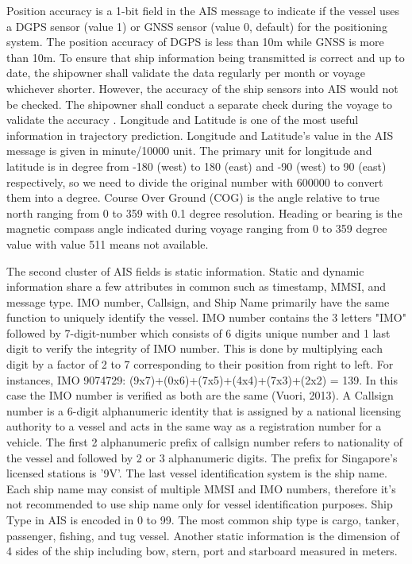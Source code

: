 Position accuracy is a 1-bit field in the AIS message to indicate if the vessel uses a DGPS sensor (value 1) or GNSS sensor (value 0, default) for the positioning system. The position accuracy of DGPS is less than 10m while GNSS is more than 10m. To ensure that ship information being transmitted is correct and up to date, the shipowner shall validate the data regularly per month or voyage whichever shorter. However, the accuracy of the ship sensors into AIS would not be checked. The shipowner shall conduct a separate check during the voyage to validate the accuracy \cite{imo1998}. Longitude and Latitude is one of the most useful information in trajectory prediction. Longitude and Latitude's value in the AIS message is given in minute/10000 unit. The primary unit for longitude and latitude is in degree from -180 (west) to 180 (east) and -90 (west) to 90 (east) respectively, so we need to divide the original number with 600000 to convert them into a degree. Course Over Ground (COG) is the angle relative to true north ranging from 0 to 359 with 0.1 degree resolution. Heading or bearing is the magnetic compass angle indicated during voyage ranging from 0 to 359 degree value with value 511 means not available.

The second cluster of AIS fields is static information. Static and dynamic information share a few attributes in common such as timestamp, MMSI, and message type. IMO number, Callsign, and Ship Name primarily have the same function to uniquely identify the vessel. IMO number contains the 3 letters "IMO" followed by 7-digit-number which consists of 6 digits unique number and 1 last digit to verify the integrity of IMO number. This is done by multiplying each digit by a factor of 2 to 7 corresponding to their position from right to left. For instances, IMO 9074729: (9x7)+(0x6)+(7x5)+(4x4)+(7x3)+(2x2) = 139. In this case the IMO number is verified as both are the same (Vuori, 2013). A Callsign number is a 6-digit alphanumeric identity that is assigned by a national licensing authority to a vessel and acts in the same way as a registration number for a vehicle. The first 2 alphanumeric prefix of callsign number refers to nationality of the vessel and followed by 2 or 3 alphanumeric digits. The prefix for Singapore's licensed stations is '9V'. The last vessel identification system is the ship name. Each ship name may consist of multiple MMSI and IMO numbers, therefore it's not recommended to use ship name only for vessel identification purposes. Ship Type in AIS is encoded in 0 to 99. The most common ship type is cargo, tanker, passenger, fishing, and tug vessel. Another static information is the dimension of 4 sides of the ship including bow, stern, port and starboard measured in meters. 

